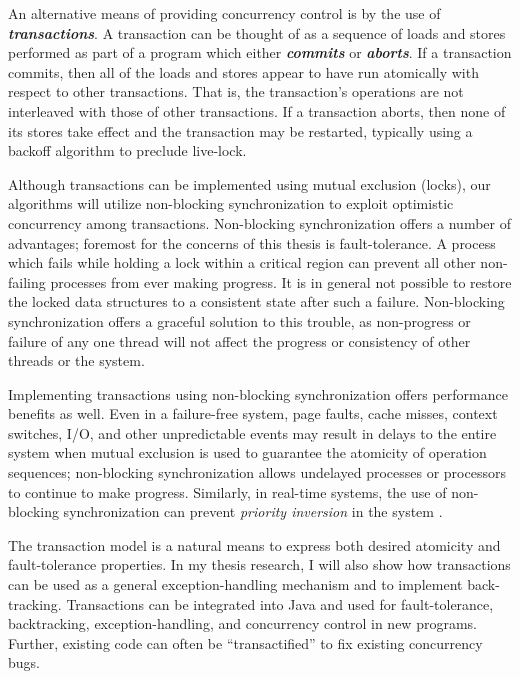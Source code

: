 \documentclass[12pt]{article}
\newcommand{\defn}[1]           {{\textit{\textbf{\boldmath #1}}}}
\begin{document}
An alternative means of providing concurrency control is by the use of
\defn{transactions}.
A transaction can be thought of as a sequence of loads and stores
performed as part of a program which either
\defn{commits} or \defn{aborts}.  If a transaction
commits, then all of the loads and stores appear to have run
atomically with respect to other transactions.  That is, the
transaction's operations are not interleaved with those of other
transactions.  If a transaction aborts, then none of its stores take
effect and the transaction may be restarted, typically using a
backoff algorithm to preclude live-lock.

Although transactions can be implemented using mutual exclusion
(locks), our algorithms will utilize non-blocking synchronization
\cite{Lamport77,Herlihy88,HerlihyLuMo03,MassalinPu91,GreenwaldCh96} to
exploit optimistic concurrency among transactions.  Non-blocking
synchronization offers a number of advantages; foremost for the
concerns of this thesis is fault-tolerance.  A process which fails
while holding a lock within a critical region can prevent all other
non-failing processes from ever making progress.  It is in general not
possible to restore the locked data structures to a consistent state
after such a failure.  Non-blocking synchronization offers a graceful
solution to this trouble, as non-progress or failure of any one thread
will not affect the progress or consistency of other threads or the
system.

Implementing transactions using
non-blocking synchronization offers performance benefits as well.
Even in a failure-free system, page faults, cache misses, context
switches, I/O, and other unpredictable events may result in delays to the
entire system when mutual exclusion is used to guarantee the atomicity
of operation sequences; non-blocking
synchronization allows undelayed processes or processors to continue
to make progress.
Similarly, in real-time systems, the use of non-blocking
synchronization can prevent \emph{priority inversion} in the system
\cite{Jones97}.

The transaction model is a natural means to express both desired
atomicity and fault-tolerance properties.  In my thesis research, I
will also show how transactions can be used as a general
exception-handling mechanism and to implement back-tracking.
Transactions can be integrated into Java and used for fault-tolerance,
backtracking, exception-handling, and concurrency control in new
programs.  Further, existing code can often be ``transactified'' to
fix existing concurrency bugs.
\end{document}
